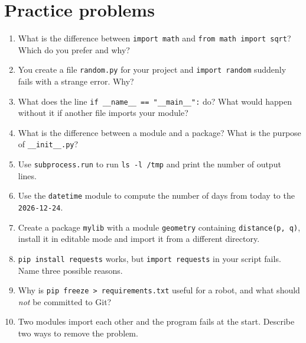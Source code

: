 \section*{Practice problems}
\begin{enumerate}[label=\textbf{\thechapter.\arabic*}]
  \item What is the difference between \verb!import math! and \verb!from math import sqrt!? Which do you prefer and why?
  \item You create a file \texttt{random.py} for your project and \verb!import random! suddenly fails with a strange error. Why?
  \item What does the line \verb!if __name__ == "__main__":! do? What would happen without it if another file imports your module?
  \item What is the difference between a module and a package? What is the purpose of \texttt{\_\_init\_\_.py}?
  \item Use \texttt{subprocess.run} to run \verb!ls -l /tmp! and print the number of output lines.
  \item Use the \texttt{datetime} module to compute the number of days from today to the \texttt{2026-12-24}.
  \item Create a package \texttt{mylib} with a module \texttt{geometry} containing \texttt{distance(p, q)}, install it in editable mode and import it from a different directory.
  \item \verb!pip install requests! works, but \verb!import requests! in your script fails. Name three possible reasons.
  \item Why is \verb!pip freeze > requirements.txt! useful for a robot, and what should \emph{not} be committed to Git?
  \item[\textbf{\thechapter.10}$\star$] Two modules import each other and the program fails at the start. Describe two ways to remove the problem.
\end{enumerate}
